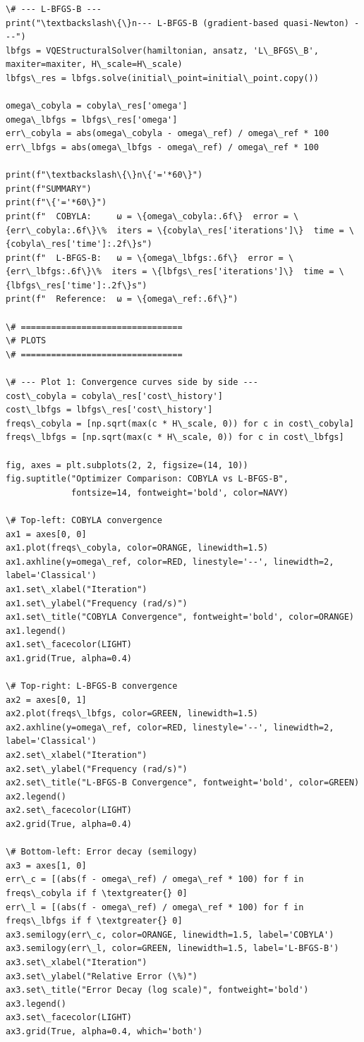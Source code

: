 \documentclass[12pt, a4paper]{article}
\begin{document}
\begin{lstlisting}[style=codestyle, caption={{optimizer_comparison.py --- COBYLA vs L-BFGS-B}}]
\# --- L-BFGS-B ---
print("\textbackslash\{\}n--- L-BFGS-B (gradient-based quasi-Newton) ---")
lbfgs = VQEStructuralSolver(hamiltonian, ansatz, 'L\_BFGS\_B', maxiter=maxiter, H\_scale=H\_scale)
lbfgs\_res = lbfgs.solve(initial\_point=initial\_point.copy())

omega\_cobyla = cobyla\_res['omega']
omega\_lbfgs = lbfgs\_res['omega']
err\_cobyla = abs(omega\_cobyla - omega\_ref) / omega\_ref * 100
err\_lbfgs = abs(omega\_lbfgs - omega\_ref) / omega\_ref * 100

print(f"\textbackslash\{\}n\{'='*60\}")
print(f"SUMMARY")
print(f"\{'='*60\}")
print(f"  COBYLA:     ω = \{omega\_cobyla:.6f\}  error = \{err\_cobyla:.6f\}\%  iters = \{cobyla\_res['iterations']\}  time = \{cobyla\_res['time']:.2f\}s")
print(f"  L-BFGS-B:   ω = \{omega\_lbfgs:.6f\}  error = \{err\_lbfgs:.6f\}\%  iters = \{lbfgs\_res['iterations']\}  time = \{lbfgs\_res['time']:.2f\}s")
print(f"  Reference:  ω = \{omega\_ref:.6f\}")

\# ================================
\# PLOTS
\# ================================

\# --- Plot 1: Convergence curves side by side ---
cost\_cobyla = cobyla\_res['cost\_history']
cost\_lbfgs = lbfgs\_res['cost\_history']
freqs\_cobyla = [np.sqrt(max(c * H\_scale, 0)) for c in cost\_cobyla]
freqs\_lbfgs = [np.sqrt(max(c * H\_scale, 0)) for c in cost\_lbfgs]

fig, axes = plt.subplots(2, 2, figsize=(14, 10))
fig.suptitle("Optimizer Comparison: COBYLA vs L-BFGS-B",
             fontsize=14, fontweight='bold', color=NAVY)

\# Top-left: COBYLA convergence
ax1 = axes[0, 0]
ax1.plot(freqs\_cobyla, color=ORANGE, linewidth=1.5)
ax1.axhline(y=omega\_ref, color=RED, linestyle='--', linewidth=2, label='Classical')
ax1.set\_xlabel("Iteration")
ax1.set\_ylabel("Frequency (rad/s)")
ax1.set\_title("COBYLA Convergence", fontweight='bold', color=ORANGE)
ax1.legend()
ax1.set\_facecolor(LIGHT)
ax1.grid(True, alpha=0.4)

\# Top-right: L-BFGS-B convergence
ax2 = axes[0, 1]
ax2.plot(freqs\_lbfgs, color=GREEN, linewidth=1.5)
ax2.axhline(y=omega\_ref, color=RED, linestyle='--', linewidth=2, label='Classical')
ax2.set\_xlabel("Iteration")
ax2.set\_ylabel("Frequency (rad/s)")
ax2.set\_title("L-BFGS-B Convergence", fontweight='bold', color=GREEN)
ax2.legend()
ax2.set\_facecolor(LIGHT)
ax2.grid(True, alpha=0.4)

\# Bottom-left: Error decay (semilogy)
ax3 = axes[1, 0]
err\_c = [(abs(f - omega\_ref) / omega\_ref * 100) for f in freqs\_cobyla if f \textgreater{} 0]
err\_l = [(abs(f - omega\_ref) / omega\_ref * 100) for f in freqs\_lbfgs if f \textgreater{} 0]
ax3.semilogy(err\_c, color=ORANGE, linewidth=1.5, label='COBYLA')
ax3.semilogy(err\_l, color=GREEN, linewidth=1.5, label='L-BFGS-B')
ax3.set\_xlabel("Iteration")
ax3.set\_ylabel("Relative Error (\%)")
ax3.set\_title("Error Decay (log scale)", fontweight='bold')
ax3.legend()
ax3.set\_facecolor(LIGHT)
ax3.grid(True, alpha=0.4, which='both')


\end{lstlisting}
\end{document}
